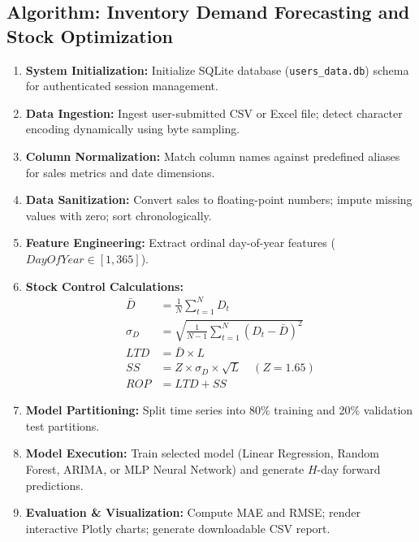 \documentclass[12pt,a4paper]{report}
\begin{document}
\subsection{Algorithm: Inventory Demand Forecasting and Stock Optimization}
\begin{enumerate}
    \item \textbf{System Initialization:} Initialize SQLite database (\texttt{users\_data.db}) schema for authenticated session management.
    \item \textbf{Data Ingestion:} Ingest user-submitted CSV or Excel file; detect character encoding dynamically using byte sampling.
    \item \textbf{Column Normalization:} Match column names against predefined aliases for sales metrics and date dimensions.
    \item \textbf{Data Sanitization:} Convert sales to floating-point numbers; impute missing values with zero; sort chronologically.
    \item \textbf{Feature Engineering:} Extract ordinal day-of-year features ($DayOfYear \in [1, 365]$).
    \item \textbf{Stock Control Calculations:}
    \begin{align*}
        \bar{D} &= \frac{1}{N}\sum_{t=1}^N D_t \\
        \sigma_D &= \sqrt{\frac{1}{N-1}\sum_{t=1}^N (D_t - \bar{D})^2} \\
        LTD &= \bar{D} \times L \\
        SS &= Z \times \sigma_D \times \sqrt{L} \quad (Z = 1.65) \\
        ROP &= LTD + SS
    \end{align*}
    \item \textbf{Model Partitioning:} Split time series into 80\% training and 20\% validation test partitions.
    \item \textbf{Model Execution:} Train selected model (Linear Regression, Random Forest, ARIMA, or MLP Neural Network) and generate $H$-day forward predictions.
    \item \textbf{Evaluation \& Visualization:} Compute MAE and RMSE; render interactive Plotly charts; generate downloadable CSV report.
\end{enumerate}
\end{document}
